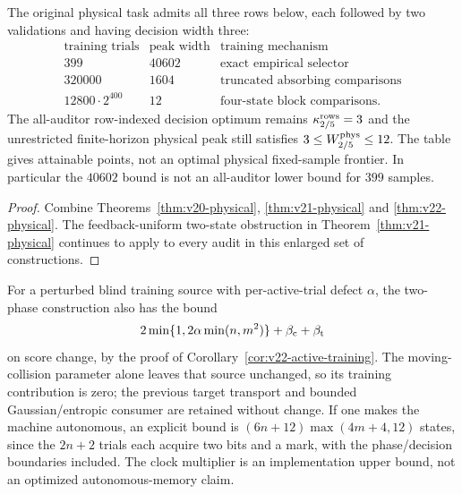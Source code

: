 \begin{corollary}
\label{cor:v22-physical-regimes}
The original physical task admits all three rows below, each followed
by two validations and having decision width three:
\[
\begin{array}{c|r|l}
 \text{training trials}&\text{peak width}&\text{training mechanism}\\\hline
 399&40602&\text{exact empirical selector}\\
 320000&1604&\text{truncated absorbing comparisons}\\
 12800\cdot2^{400}&12&\text{four-state block comparisons}.
\end{array}
\]
The all-auditor row-indexed decision optimum remains
$\kappa^{\rm rows}_{2/5}=3$ and the unrestricted finite-horizon
physical peak still satisfies $3\le W^{\rm phys}_{2/5}\le12$.
The table gives attainable points, not an optimal physical fixed-sample
frontier. In particular the $40602$ bound is not an all-auditor lower
bound for $399$ samples.
\end{corollary}
\begin{proof}
Combine Theorems~\ref{thm:v20-physical}, \ref{thm:v21-physical} and
\ref{thm:v22-physical}. The feedback-uniform two-state obstruction in
Theorem~\ref{thm:v21-physical} continues to apply to every audit in
this enlarged set of constructions.
\end{proof}

For a perturbed blind training source with per-active-trial defect
$\alpha$, the two-phase construction also has the bound
\[
 2\min\{1,2\alpha\min(n,m^2)\}
       +\beta_{\rm c}+\beta_{\rm t}
\]
on score change, by the proof of Corollary~\ref{cor:v22-active-training}.
The moving-collision parameter alone leaves that source unchanged, so
its training contribution is zero; the previous target transport and
bounded Gaussian/entropic consumer are retained without change. If
one makes the machine autonomous, an explicit bound is
$(6n+12)\max(4m+4,12)$ states, since the $2n+2$ trials each acquire two
bits and a mark, with the phase/decision boundaries included. The
clock multiplier is an implementation upper bound, not an optimized
autonomous-memory claim.
